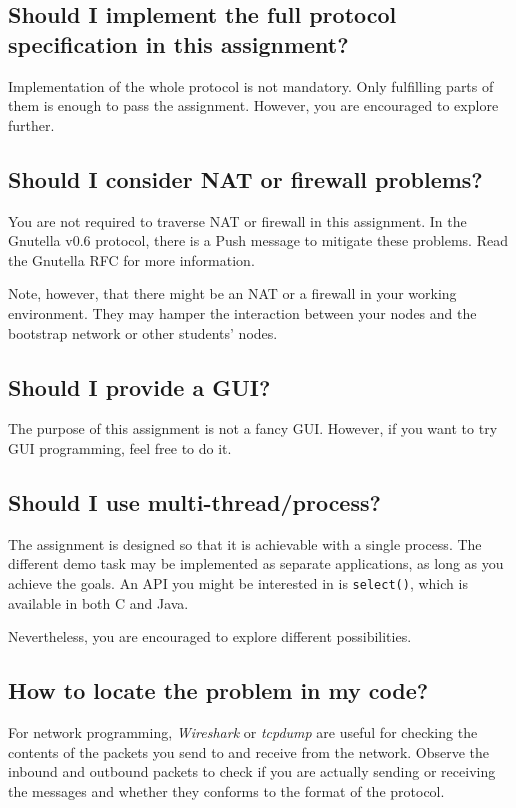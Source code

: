 \documentclass[12pt, a4paper]{article}
\begin{document}
\subsection*{Should I implement the full protocol specification in this assignment?}
Implementation of the whole protocol is not mandatory.
Only fulfilling parts of them is enough to pass the assignment.
However, you are encouraged to explore further.

\subsection*{Should I consider NAT or firewall problems?}
You are not required to traverse NAT or firewall in this assignment.
In the Gnutella v0.6 protocol, there is a Push message to mitigate these problems.
Read the Gnutella RFC for more information.

Note, however, that there might be an NAT or a firewall in your working environment.
They may hamper the interaction between your nodes and the bootstrap network or other students' nodes.

\subsection*{Should I provide a GUI?}
The purpose of this assignment is not a fancy GUI.
However, if you want to try GUI programming, feel free to do it.

\subsection*{Should I use multi-thread/process?}
The assignment is designed so that it is achievable with a single process.
The different demo task may be implemented as separate applications, as long as you achieve the goals.
An API you might be interested in is \texttt{select()}, which is available in both C and Java.

Nevertheless, you are encouraged to explore different possibilities.

\subsection*{How to locate the problem in my code?}
For network programming, \emph{Wireshark} or \emph{tcpdump} are useful for checking the contents of the packets you send to and receive from the network.
Observe the inbound and outbound packets to check if you are actually sending or receiving the messages and whether they conforms to the format of the protocol.
\end{document}
